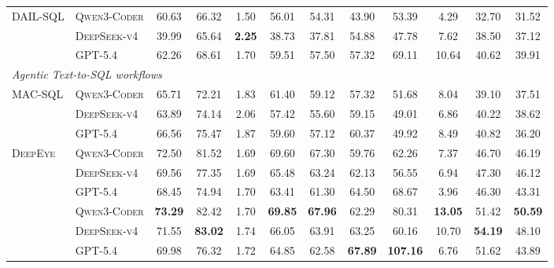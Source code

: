 \begin{table}[t]
{\begin{tabular}{llcccccccccc}
		\multirow{3}{*}{\textsc{DAIL-SQL}}
		& \textsc{Qwen3-Coder} 
		& 60.63 & 66.32 & 1.50 & 56.01 & 54.31 & 43.90 & 53.39 & 4.29 & 32.70 & 31.52 \\
		& \textsc{DeepSeek-v4} 
		& 39.99 & 65.64 & \textbf{2.25} & 38.73 & 37.81 & 54.88 & 47.78 & 7.62 & 38.50 & 37.12 \\
		& \textsc{GPT-5.4} 
		& 62.26 & 68.61 & 1.70 & 59.51 & 57.50 & 57.32 & 69.11 & 10.64 & 40.62 & 39.91 \\
		
		\midrule
		\multicolumn{12}{l}{\textit{Agentic Text-to-SQL workflows}} \\
		\midrule
		\multirow{3}{*}{\textsc{MAC-SQL}}
		& \textsc{Qwen3-Coder} 
		& 65.71 & 72.21 & 1.83 & 61.40 & 59.12 & 57.32 & 51.68 & 8.04 & 39.10 & 37.51 \\
		& \textsc{DeepSeek-v4} 
		& 63.89 & 74.14 & 2.06 & 57.42 & 55.60 & 59.15 & 49.01 & 6.86 & 40.22 & 38.62 \\
		& \textsc{GPT-5.4} 
		& 66.56 & 75.47 & 1.87 & 59.60 & 57.12 & 60.37 & 49.92 & 8.49 & 40.82 & 36.20 \\
		\midrule
		
		\multirow{3}{*}{\textsc{DeepEye}}
		& \textsc{Qwen3-Coder} 
		& 72.50 & 81.52 & 1.69 & 69.60 & 67.30 & 59.76 & 62.26 & 7.37 & 46.70 & 46.19 \\
		& \textsc{DeepSeek-v4} 
		& 69.56 & 77.35 & 1.69 & 65.48 & 63.24 & 62.13 & 56.55 & 6.94 & 47.30 & 46.12 \\
		& \textsc{GPT-5.4} 
		& 68.45 & 74.94 & 1.70 & 63.41 & 61.30 & 64.50 &68.67 & 3.96 & 46.30 & 43.31 \\
		
		\midrule
		\rowcolor{gray!10}
		& \textsc{Qwen3-Coder}
		& \textbf{73.29} & 82.42 & 1.70 & \textbf{69.85} & \textbf{67.96}
		& 62.29 & 80.31 & \textbf{13.05} & 51.42 & \textbf{50.59} \\
		
		\rowcolor{gray!10}
		& \textsc{DeepSeek-v4}
		& 71.55 & \textbf{83.02} & 1.74 & 66.05 & 63.91
		& 63.25 & 60.16 & 10.70 & \textbf{54.19} & 48.10 \\
		
		\rowcolor{gray!10}
		\multirow{-3}{*}{\cellcolor{gray!10}\textbf{\toolname}}
		& \textsc{GPT-5.4}
		& 69.98 & 76.32 & 1.72 & 64.85 & 62.58
		& \textbf{67.89} & \textbf{107.16} & 6.76 & 51.62 & 43.89 \\
		
		
		\bottomrule
	\end{tabular}
	}
	\vspace{-2mm}
	
\end{table}


